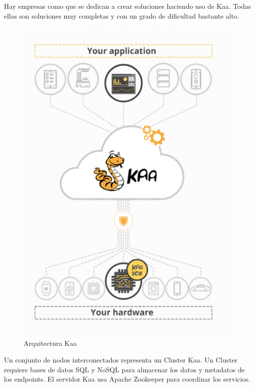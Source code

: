 \documentclass[12pt, twoside]{book}
\newcommand{\MYhref}[3][blue]{\href{#2}{\color{#1}{#3}}}
\begin{document}
Hay empresas como \MYhref{https://www.kaaiot.io/solutions}{Kaaiot} que se dedican a crear soluciones haciendo uso de Kaa. Todas ellas son soluciones muy completas y con un grado de dificultad bastante alto.
\begin{figure}[H]
\centering
\includegraphics[scale=0.5]{images/kaa_platform}
\caption{Arquitectura Kaa}\label{L501}
\end{figure}
Un conjunto de nodos interconectados representa un Cluster Kaa. Un Cluster requiere bases de datos SQL y NoSQL para almacenar los datos y metadatos de los endpoints. El servidor Kaa usa Apache Zookeeper para coordinar los servicios.
\end{document}
